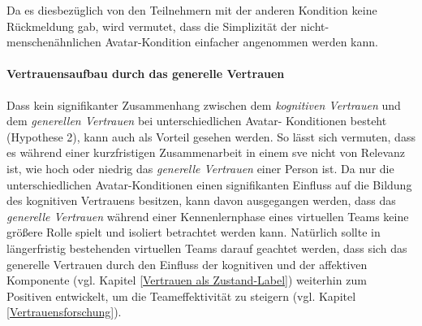 \documentclass[a4paper,11pt]{article}%
\renewcommand{\\}{\vspace*{0.5\baselineskip} \newline}
\begin{document}
{{Da es diesbezüglich von den Teilnehmern mit der anderen Kondition keine Rückmeldung gab, wird vermutet, dass die Simplizität der nicht-menschenähnlichen Avatar-Kondition einfacher angenommen werden kann.

\paragraph{Vertrauensaufbau durch das generelle Vertrauen}
Dass kein signifikanter Zusammenhang zwischen dem \textit{kognitiven Vertrauen} und dem \textit{generellen Vertrauen} bei unterschiedlichen Avatar- Konditionen besteht (Hypothese 2), kann auch als Vorteil gesehen werden.
So lässt sich vermuten, dass es während einer kurzfristigen Zusammenarbeit in einem \ac{sve} nicht von Relevanz ist, wie hoch oder niedrig das \textit{generelle Vertrauen} einer Person ist. 
Da nur die unterschiedlichen Avatar-Konditionen einen signifikanten Einfluss auf die Bildung des kognitiven Vertrauens besitzen, kann davon ausgegangen werden, dass das \textit{generelle Vertrauen} während einer Kennenlernphase eines virtuellen Teams keine größere Rolle spielt und isoliert betrachtet werden kann. Natürlich sollte in längerfristig bestehenden virtuellen Teams darauf geachtet werden, dass sich das generelle Vertrauen durch den Einfluss der kognitiven und der affektiven Komponente (vgl. Kapitel \ref{Vertrauen als Zustand-Label}) weiterhin zum Positiven entwickelt, um die Teameffektivität zu steigern (vgl. Kapitel \ref{Vertrauensforschung}).
%
%
}}
\end{document}
